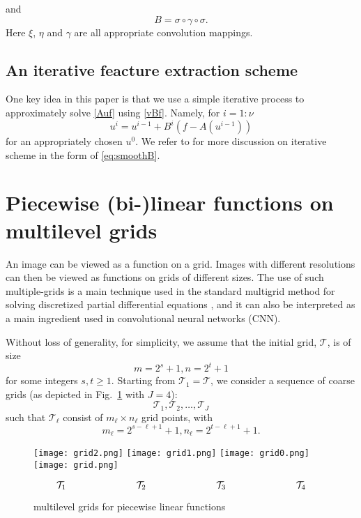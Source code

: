 and 
\begin{equation}
\label{extractor}
B=\sigma\circ \gamma \circ\sigma  .
\end{equation}
Here $\xi$, $\eta$ and $\gamma$ are all 
appropriate convolution mappings.


\subsection{An iterative feacture extraction scheme}
One key idea in this paper is that we use a simple iterative
process to approximately solve \eqref{Auf} using \eqref{vBf}. Namely,
for $i=1:\nu$
\begin{equation}\label{eq:smoothB}
u^{i} = u^{i-1} + B^{i}(f- A(u^{i-1})) 
\end{equation}
for an appropriately chosen $u^0$.  We refer to \cite{xu1992iterative}
for more discussion on iterative scheme in the form of \eqref{eq:smoothB}.



\section{Piecewise (bi-)linear functions on multilevel grids}\label{sec:functions}
An image can be viewed as a function on a grid.  Images
with different resolutions can then be viewed as functions on grids of
different sizes.  The use of such multiple-grids is a main technique
used in the standard multigrid method for solving discretized partial
differential equations \cite{xu1992iterative, xu2002method}, 
and it can also be interpreted as a main ingredient used in
convolutional neural networks (CNN). 

Without loss of generality, for simplicity, we assume that the initial
grid, $\mathcal T$, is of size
$$
m=2^{s}+1, n=2^{t}+1 
$$
for some integers $s, t\ge 1$.
Starting from $\mathcal T_1=\mathcal T$,  we consider a sequence of
coarse grids (as depicted in Fig.~\ref{mgrid} with $J=4$):
\begin{equation}
\label{grids}
\mathcal T_1, \mathcal T_2, \ldots, \mathcal T_J
\end{equation}
such that ${\mathcal T}_\ell$ consist of $m_\ell\times n_\ell$ grid
points, with 
\begin{equation}
\label{mn-ell}
m_\ell=2^{s-\ell+1}+1, n_\ell=2^{t-\ell+1}+1.   
\end{equation}
\begin{figure}[!htbp]\label{mgrid}
	\begin{center}
		\texttt{[image: grid2.png]} \quad 
		\texttt{[image: grid1.png]} \quad 
		\texttt{[image: grid0.png]} \quad 
		\texttt{[image: grid.png]} 
	\end{center}
	$$ 
	\mathcal T_1\hskip1in \mathcal T_2\hskip1in \mathcal T_3\hskip1in\mathcal T_4
	$$
	\caption{multilevel grids for piecewise linear functions}
\end{figure}

